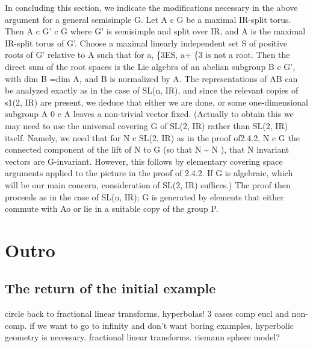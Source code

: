 \documentclass[
  12pt
]{article}
\theoremstyle{break}
\theoremstyle{plain}
\begin{document}
   In concluding this section, we indicate the
  modifications necessary in the above argument for a general semisimple
  G. Let A c G be a maximal IR-split torus. Then A c G' c G where G' is
  semisimple and split over IR, and A is the maximal IR-split torus of G'.
  Choose a maximal linearly independent set S of positive roots of G'
  relative to A such that for a, \{3ES, a+ \{3 is not a root. Then the
  direct sum of the root spaces is the Lie algebra of an abelian subgroup
  B c G', with dim B =dim A, and B is normalized by A. The representations
  of AB can be analyzed exactly as in the case of SL(n, IR), and since the
  relevant copies of s1(2, IR) are present, we deduce that either we are
  done, or some one-dimensional subgroup A 0 c A leaves a non-trivial
  vector fixed. (Actually to obtain this we may need to use the universal
  covering G of SL(2, IR) rather than SL(2, IR) itself. Namely, we need
  that for N c SL(2, IR) as in the proof of2.4.2, N c G the connected
  component of the lift of N to G (so that N \textasciitilde{} N ), that N
  invariant vectors are G-invariant. However, this follows by elementary
  covering space arguments applied to the picture in the proof of 2.4.2.
  If G is algebraic, which will be our main concern, consideration of
  SL(2, IR) suffices.) The proof then proceeds as in the case of SL(n,
  IR); G is generated by elements that either commute with Ao or lie in a
  suitable copy of the group P.




\hypertarget{outro}{%
\section{Outro}\label{outro}}


  \hypertarget{return-of-the-initial-example}{%
  \subsection{The return of the initial example
  }\label{return-of-the-initial-example}}

  circle back to fractional linear transforms.
  hyperbolas! 3 cases comp eucl and non-comp. if we want to go to infinity
  and don't want boring examples, hyperbolic geometry is necessary.
  fractional linear transforms. riemann sphere model?


\end{document}
